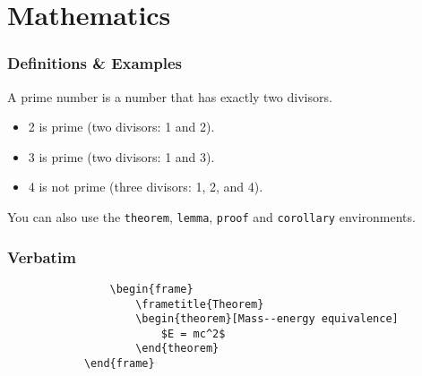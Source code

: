 \documentclass[
11pt, %
serif
]{beamer}
\begin{document}
	
	
	\section{Mathematics}
	
	\begin{frame}
		\frametitle{Definitions \& Examples}
		
		\begin{definition}
			A \alert{prime number} is a number that has exactly two divisors.
		\end{definition}
		
		\smallskip %
		
		\begin{example}
			\begin{itemize}
				\item 2 is prime (two divisors: 1 and 2).
				\item 3 is prime (two divisors: 1 and 3).
				\item 4 is not prime (\alert{three} divisors: 1, 2, and 4).
			\end{itemize}
		\end{example}
		
		\smallskip %
		
		You can also use the \texttt{theorem}, \texttt{lemma}, \texttt{proof} and \texttt{corollary} environments.
	\end{frame}
	
	
	\begin{frame}[fragile] %
		\frametitle{Verbatim}
		
		\begin{example}
			\begin{verbatim}
				\begin{frame}
					\frametitle{Theorem}
					\begin{theorem}[Mass--energy equivalence]
						$E = mc^2$
					\end{theorem}
			\end{frame}\end{verbatim} %
		\end{example}
	\end{frame}
	
\end{document}
